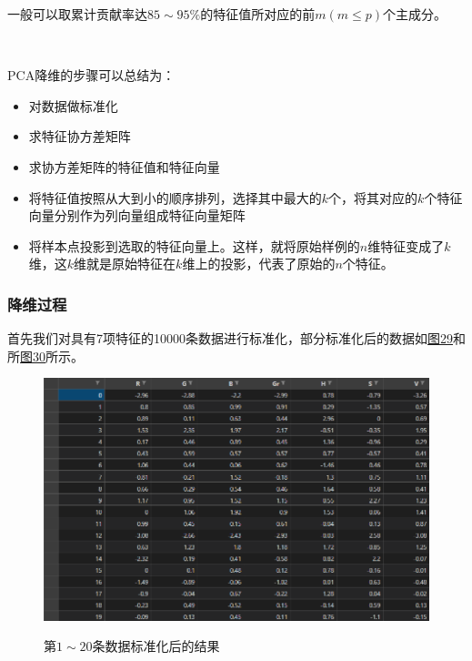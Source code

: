 \documentclass[UTF8]{ctexart}
\begin{document}
	一般可以取累计贡献率达$85\sim 95\%$的特征值所对应的前$m(m \leq p)$个主成分。
	
	~\
	
	PCA降维的步骤可以总结为：
	\begin{itemize}
		\item 对数据做标准化
		\item 求特征协方差矩阵
		\item 求协方差矩阵的特征值和特征向量
		\item 将特征值按照从大到小的顺序排列，选择其中最大的$k$个，将其对应的$k$个特征向量分别作为列向量组成特征向量矩阵
		\item 将样本点投影到选取的特征向量上。这样，就将原始样例的$n$维特征变成了$k$维，这$k$维就是原始特征在$k$维上的投影，代表了原始的$n$个特征。
	\end{itemize} 

	\subsubsection{降维过程} 首先我们对具有7项特征的10000条数据进行标准化，部分标准化后的数据如\hyperref[Fig.29]{图29}和所\hyperref[Fig.30]{图30}所示。
	
	\begin{figure}[htbp]
		\centering
		\caption{第$1\sim20$条数据标准化后的结果}
		\includegraphics[width=1.0\textwidth]{data_standard1.png}
		\label{Fig.29}
	\end{figure}
\end{document}
